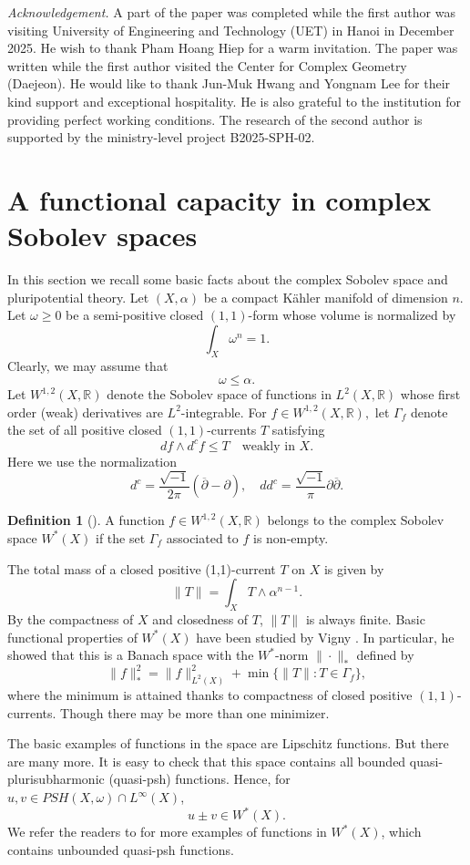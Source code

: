 \documentclass{amsart}
\renewcommand{\d}{\partial}
\newcommand{\dbar}{\overline{\d}}
\newcommand{\ii}{\sqrt{-1}}
\newcommand{\al}{\alpha}
\newcommand{\om}{\omega}
\newcommand{\Ga}{\Gamma}
\newcommand{\bR}{\mathbb{R}}
\theoremstyle{definition}
\newtheorem{defn}[thm]{Definition}
\numberwithin{thm}{section}
\numberwithin{equation}{section}
\renewcommand{\[}{\begin{equation}}
\renewcommand{\]}{\end{equation}}
\newcommand{\wed}{\wedge}
\begin{document}
{\em Acknowledgement.}  A part of the paper was completed while the first author was visiting University of Engineering and Technology (UET) in Hanoi in December 2025. He wish to thank Pham Hoang Hiep for a warm invitation.  The paper was written while the first author  visited the Center for Complex Geometry (Daejeon). He would like to thank Jun-Muk Hwang and Yongnam Lee for their kind support and exceptional hospitality. He is also grateful to the institution for providing perfect working conditions.  The research of the second author is supported by the ministry-level project B2025-SPH-02.



\section{A functional capacity in complex Sobolev spaces} 
\label{sec:cap}
In this section we recall some  basic facts about the complex Sobolev space and pluripotential theory.  Let $(X,\al)$ be a compact K\"ahler manifold of dimension $n$. Let $\om\geq 0$ be a semi-positive closed $(1,1)$-form whose volume  is normalized by 
\[\label{eq:norm-om} \int_X \om^n =1.\]
Clearly, we may assume that 
\[\label{eq:al-om}
	\om \leq \al. 
\]
Let  $W^{1,2}(X,\bR)$ denote the Sobolev space of functions in $L^2(X,\bR)$ whose first  order (weak) derivatives are $L^2$-integrable. For $f\in W^{1,2}(X,\bR),$ let $\Ga_f$  denote the set of all positive closed $(1,1)$-currents $T$ satisfying
\[\label{eq:w-ineq}
	df \wed d^c f  \leq T \quad\text{weakly in } X.
\]
Here we use the normalization 
$$d^c = \frac{\ii}{2\pi} (\dbar -\d), \quad dd^c = \frac{\ii}{\pi}\d\dbar.
$$
\begin{defn}[\cite{DS}]
A function $f\in W^{1,2}(X,\bR)$ belongs to the complex Sobolev space $W^*(X)$ if the set $\Ga_f$ associated to $f$ is non-empty.
\end{defn}
The total mass of a closed positive (1,1)-current $T$ on $X$ is given by
$$
	\|T\| = \int_X T \wed\al^{n-1}.
$$
By the compactness of $X$ and closedness of $T$, $\|T\|$ is always finite. Basic functional properties of $W^*(X)$ have been studied by Vigny \cite{Vigny}. In particular, 
he showed  that this is a Banach space with the $W^*$-norm $\|\cdot\|_*$ defined by
\[\label{eq:w-norm}
	\|f\|_*^2 = \|f\|_{L^2(X)}^2 + \min\{\|T\| : T \in \Ga_f\},
\]
where the minimum is attained thanks to compactness of closed positive $(1,1)$-currents. Though there may be more than one minimizer.

The basic examples of functions in the space are Lipschitz functions. But there are many more. 
It is easy to check that this space contains all bounded quasi-plurisubharmonic (quasi-psh) functions. Hence, for $u, v \in PSH(X,\om) \cap L^\infty(X)$,
$$
	u \pm v \in W^*(X).
$$
We refer the readers to \cite{Vigny} for more examples of functions in $W^*(X)$, which contains unbounded quasi-psh functions.
\end{document}
